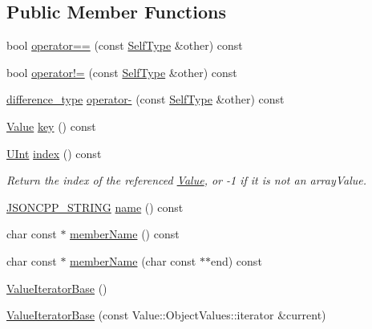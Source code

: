 \subsection*{Public Member Functions}
\begin{DoxyCompactItemize}
\item 
bool \hyperlink{class_json_1_1_value_iterator_base_a1248d8016f88b51371a0fcbd355b3cfd}{operator==} (const \hyperlink{class_json_1_1_value_iterator_base_a9d2a940d03ea06d20d972f41a89149ee}{Self\+Type} \&other) const
\item 
bool \hyperlink{class_json_1_1_value_iterator_base_aa83bdcc8114b7d040eb8eb42eeed5f4a}{operator!=} (const \hyperlink{class_json_1_1_value_iterator_base_a9d2a940d03ea06d20d972f41a89149ee}{Self\+Type} \&other) const
\item 
\hyperlink{class_json_1_1_value_iterator_base_a4e44bf8cbd17ec8d6e2c185904a15ebd}{difference\+\_\+type} \hyperlink{class_json_1_1_value_iterator_base_a98e254263fca5f1fc8fcac7bcb0260bf}{operator-\/} (const \hyperlink{class_json_1_1_value_iterator_base_a9d2a940d03ea06d20d972f41a89149ee}{Self\+Type} \&other) const
\item 
\hyperlink{class_json_1_1_value}{Value} \hyperlink{class_json_1_1_value_iterator_base_a3838ba39c43c518cf3ed4aa6ce78ccad}{key} () const
\item 
\hyperlink{namespace_json_a800fb90eb6ee8d5d62b600c06f87f7d4}{U\+Int} \hyperlink{class_json_1_1_value_iterator_base_a549c66a0bd20e9ae772175a5c0d2e88a}{index} () const
\begin{DoxyCompactList}\small\item\em Return the index of the referenced \hyperlink{class_json_1_1_value}{Value}, or -\/1 if it is not an array\+Value. \end{DoxyCompactList}\item 
\hyperlink{json_8h_a1e723f95759de062585bc4a8fd3fa4be}{J\+S\+O\+N\+C\+P\+P\+\_\+\+S\+T\+R\+I\+NG} \hyperlink{class_json_1_1_value_iterator_base_a522989403c976fdbb94da846b99418db}{name} () const
\item 
char const  $\ast$ \hyperlink{class_json_1_1_value_iterator_base_a54765da6759fd3f1edcbfbaf308ec263}{member\+Name} () const
\item 
char const  $\ast$ \hyperlink{class_json_1_1_value_iterator_base_a391c9cbd0edf9a447b37df00e8ce6059}{member\+Name} (char const $\ast$$\ast$end) const
\item 
\hyperlink{class_json_1_1_value_iterator_base_af45b028d9ff9cbd2554a87878b42dd75}{Value\+Iterator\+Base} ()
\item 
\hyperlink{class_json_1_1_value_iterator_base_a640e990e5f03a96fd650122a2906f59d}{Value\+Iterator\+Base} (const Value\+::\+Object\+Values\+::iterator \&current)
\end{DoxyCompactItemize}
